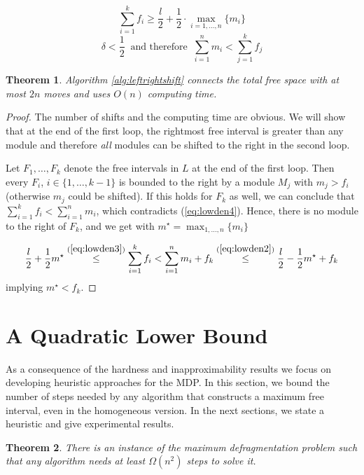 \documentclass{article}
\newtheorem{thm}{Theorem}
\begin{document}
\begin{equation}
\sum_{i=1}^k f_i \geq \frac{l}{2} + \frac{1}{2}\cdot
\max_{i=1,\ldots,n}\{m_i\} \label{eq:lowden3}
\end{equation}
\begin{equation}
\delta < \frac{1}{2} \;\; \mbox{and therefore} \;\; \sum_{i=1}^n m_i
< \sum_{j=1}^k f_j \label{eq:lowden4}
\end{equation}

\begin{thm}\label{thm:totfslowden}
Algorithm \ref{alg:leftrightshift} connects the total free space
with at most $2n$ moves and uses $O(n)$ computing time.
\end{thm}

\begin{proof}
The number of shifts and the computing time are obvious. We will
show that at the end of the first loop, the rightmost free interval is
greater than any module and therefore {\em all} modules can be
shifted to the right in the second loop.

Let $F_1,\ldots,F_k$ denote the free intervals in $L$ at the end of the
first loop. Then every $F_i$, $i\in \{1,\ldots,k-1\}$ is bounded to
the right by a module $M_{j}$ with $m_{j} > f_i$ (otherwise $m_j$
could be shifted). If this holds for $F_k$ as well, we can
conclude that $\sum_{i=1}^k f_i < \sum_{i=1}^n m_i$, which
contradicts (\ref{eq:lowden4}). Hence, there is no module to the right
of $F_k$, and we get with $m^\star = \max_{1,\ldots,n} \{m_i\}$

\begin{equation*}
\frac{l}{2} + \frac{1}{2} m^\star \stackrel{(\ref{eq:lowden3})}{\leq} \sum_{i=1}^k f_i
< \sum_{i=1}^n m_i + f_k
\stackrel{(\ref{eq:lowden2})}{\leq}
\frac{l}{2} -
\frac{1}{2}m^\star + f_k  \end{equation*}
implying
$m^\star  < f_k$.
\end{proof}

\section{A Quadratic Lower Bound}
As a consequence of the hardness and inapproximability results we
focus on developing
heuristic approaches for the MDP. 
In this section, we bound
the number of steps needed by any algorithm that constructs a
maximum free interval, even in the homogeneous version. 
In the next sections, we state a heuristic and give
experimental results.

\begin{thm}
There is an instance of the maximum defragmentation problem such
that any algorithm needs at least $\Omega(n^2)$ steps to solve it.
\end{thm}
\end{document}
